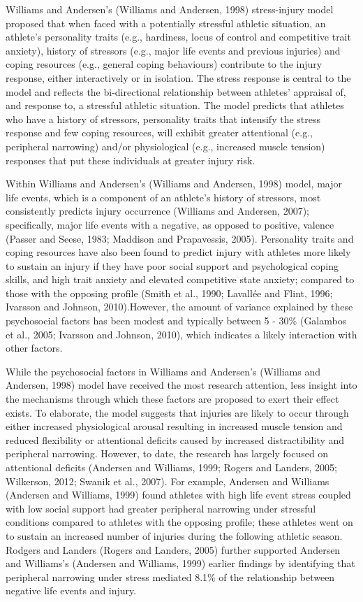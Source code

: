\documentclass[
]{frontiersHLTH}
\begin{document}
Williams and Andersen's (Williams and Andersen, 1998) stress-injury
model proposed that when faced with a potentially stressful athletic
situation, an athlete's personality traits (e.g., hardiness, locus of
control and competitive trait anxiety), history of stressors (e.g.,
major life events and previous injuries) and coping resources (e.g.,
general coping behaviours) contribute to the injury response, either
interactively or in isolation. The stress response is central to the
model and reflects the bi-directional relationship between athletes'
appraisal of, and response to, a stressful athletic situation. The model
predicts that athletes who have a history of stressors, personality
traits that intensify the stress response and few coping resources, will
exhibit greater attentional (e.g., peripheral narrowing) and/or
physiological (e.g., increased muscle tension) responses that put these
individuals at greater injury risk.

Within Williams and Andersen's (Williams and Andersen, 1998) model,
major life events, which is a component of an athlete's history of
stressors, most consistently predicts injury occurrence (Williams and
Andersen, 2007); specifically, major life events with a negative, as
opposed to positive, valence (Passer and Seese, 1983; Maddison and
Prapavessis, 2005). Personality traits and coping resources have also
been found to predict injury with athletes more likely to sustain an
injury if they have poor social support and psychological coping skills,
and high trait anxiety and elevated competitive state anxiety; compared
to those with the opposing profile (Smith et al., 1990; Lavallée and
Flint, 1996; Ivarsson and Johnson, 2010).However, the amount of variance
explained by these psychosocial factors has been modest and typically
between 5 - 30\% (Galambos et al., 2005; Ivarsson and Johnson, 2010),
which indicates a likely interaction with other factors.

While the psychosocial factors in Williams and Andersen's (Williams and
Andersen, 1998) model have received the most research attention, less
insight into the mechanisms through which these factors are proposed to
exert their effect exists. To elaborate, the model suggests that
injuries are likely to occur through either increased physiological
arousal resulting in increased muscle tension and reduced flexibility or
attentional deficits caused by increased distractibility and peripheral
narrowing. However, to date, the research has largely focused on
attentional deficits (Andersen and Williams, 1999; Rogers and Landers,
2005; Wilkerson, 2012; Swanik et al., 2007). For example, Andersen and
Williams (Andersen and Williams, 1999) found athletes with high life
event stress coupled with low social support had greater peripheral
narrowing under stressful conditions compared to athletes with the
opposing profile; these athletes went on to sustain an increased number
of injuries during the following athletic season. Rodgers and Landers
(Rogers and Landers, 2005) further supported Andersen and Williams's
(Andersen and Williams, 1999) earlier findings by identifying that
peripheral narrowing under stress mediated 8.1\% of the relationship
between negative life events and injury.
\end{document}
